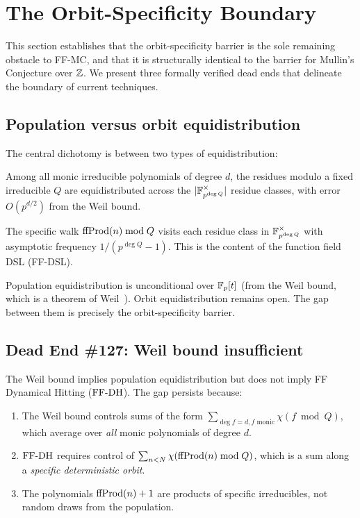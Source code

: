 \section{The Orbit-Specificity Boundary}\label{sec:barrier}

This section establishes that the orbit-specificity barrier is the sole
remaining obstacle to FF-MC, and that it is structurally identical to the
barrier for Mullin's Conjecture over $\mathbb{Z}$. We present three formally
verified dead ends that delineate the boundary of current techniques.

\subsection{Population versus orbit equidistribution}

The central dichotomy is between two types of equidistribution:

\begin{definition}
Among all monic irreducible polynomials of degree $d$, the residues
modulo a fixed irreducible $Q$ are equidistributed across the
$|\mathbb{F}_{p^{\deg Q}}^\times|$ residue classes, with error
$O(p^{d/2})$ from the Weil bound.
\end{definition}

\begin{definition}
The specific walk $\mathrm{ffProd}(n) \bmod Q$ visits each residue class in
$\mathbb{F}_{p^{\deg Q}}^\times$ with asymptotic frequency $1/(p^{\deg Q} - 1)$.
This is the content of the function field DSL (FF-DSL).
\end{definition}

Population equidistribution is unconditional over $\mathbb{F}_p[t]$ (from the Weil
bound, which is a theorem of Weil~\cite{Weil48}). Orbit equidistribution
remains open. The gap between them is precisely the orbit-specificity
barrier.

\subsection{Dead End \#127: Weil bound insufficient}

\begin{theorem}\label{thm:de127}
The Weil bound implies population equidistribution but does not imply
FF Dynamical Hitting ($\mathrm{FF\text{-}DH}$). The gap persists because:
\begin{enumerate}[label=(\roman*)]
  \item The Weil bound controls sums of the form
    $\sum_{\deg f = d, f \text{ monic}} \chi(f \bmod Q)$,
    which average over \emph{all} monic polynomials of degree $d$.
  \item $\mathrm{FF\text{-}DH}$ requires control of
    $\sum_{n < N} \chi(\mathrm{ffProd}(n) \bmod Q)$,
    which is a sum along a \emph{specific deterministic orbit}.
  \item The polynomials $\mathrm{ffProd}(n) + 1$ are products of specific
    irreducibles, not random draws from the population.
\end{enumerate}
\end{theorem}

